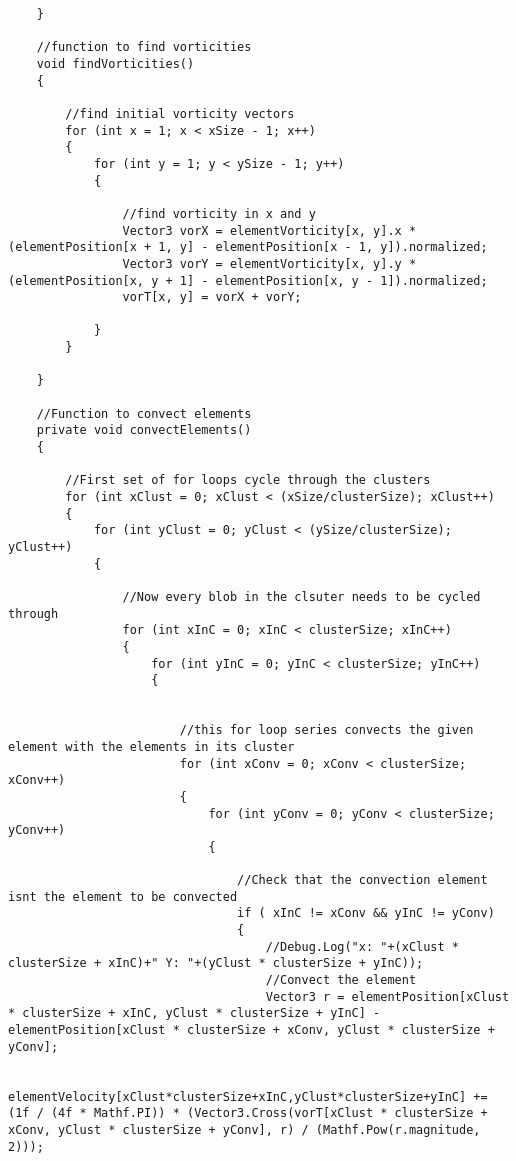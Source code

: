 \begin{mdframed}[linecolor=black, topline=true, bottomline=true,
  leftline=false, rightline=false]
\begin{verbatim}
    }

    //function to find vorticities
    void findVorticities()
    {

        //find initial vorticity vectors
        for (int x = 1; x < xSize - 1; x++)
        {
            for (int y = 1; y < ySize - 1; y++)
            {

                //find vorticity in x and y
                Vector3 vorX = elementVorticity[x, y].x * (elementPosition[x + 1, y] - elementPosition[x - 1, y]).normalized;
                Vector3 vorY = elementVorticity[x, y].y * (elementPosition[x, y + 1] - elementPosition[x, y - 1]).normalized;
                vorT[x, y] = vorX + vorY;

            }
        }

    }

    //Function to convect elements
    private void convectElements()
    {

        //First set of for loops cycle through the clusters
        for (int xClust = 0; xClust < (xSize/clusterSize); xClust++)
        {
            for (int yClust = 0; yClust < (ySize/clusterSize); yClust++)
            {

                //Now every blob in the clsuter needs to be cycled through
                for (int xInC = 0; xInC < clusterSize; xInC++)
                {
                    for (int yInC = 0; yInC < clusterSize; yInC++)
                    {


                        //this for loop series convects the given element with the elements in its cluster
                        for (int xConv = 0; xConv < clusterSize; xConv++)
                        {
                            for (int yConv = 0; yConv < clusterSize; yConv++)
                            {

                                //Check that the convection element isnt the element to be convected
                                if ( xInC != xConv && yInC != yConv)
                                {
                                    //Debug.Log("x: "+(xClust * clusterSize + xInC)+" Y: "+(yClust * clusterSize + yInC));
                                    //Convect the element
                                    Vector3 r = elementPosition[xClust * clusterSize + xInC, yClust * clusterSize + yInC] - elementPosition[xClust * clusterSize + xConv, yClust * clusterSize + yConv];

                                    elementVelocity[xClust*clusterSize+xInC,yClust*clusterSize+yInC] += (1f / (4f * Mathf.PI)) * (Vector3.Cross(vorT[xClust * clusterSize + xConv, yClust * clusterSize + yConv], r) / (Mathf.Pow(r.magnitude, 2)));
                                    

\end{verbatim}
\end{mdframed}
